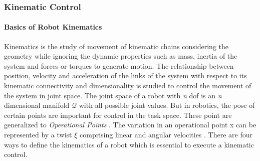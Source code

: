\subsubsection{Kinematic Control}
\paragraph{Basics of Robot Kinematics}
Kinematics is the study of movement of kinematic chains considering the geometry while ignoring the dynamic properties such as mass, inertia of the system and forces or torques to generate motion. The relationship between position, velocity and acceleration of the links of the system with respect to its kinematic connectivity and dimensionality is studied to control the movement of the system in joint space. The joint space of a robot with \textit{n} dof is an \textit{n} dimensional manifold $\mathcal{Q}$ with all possible joint values. But in robotics, the pose of certain points are important for control in the task space. These point are generalized to \textit{Operational Points} \cite{Khatib1987}. The variation in an operational point x can be represented by a twist $\xi$ comprising linear and angular velocities \cite{featherstone2008rigid,Murray1994}. There are four ways to define the kinematics of a robot which is essential to execute a kinematic control.  
